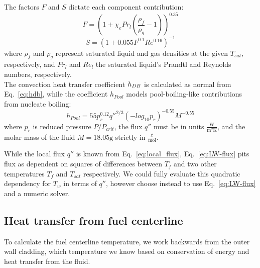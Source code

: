 \documentclass[12pt]{article}
\begin{document}
The factors $F$ and $S$ dictate each component contribution:
\begin{equation}
    \label{eq:LW-F}
    F = \left(1+\chi_ePr_l\left(\frac{\rho_f}{\rho_g}-1\right)\right)^{0.35}
\end{equation}
\begin{equation}
    \label{eq:LW-S}
    S = \left(1 + 0.055F^{0.1}Re^{0.16}\right)^{-1}
\end{equation}
where $\rho_f$ and $\rho_g$ represent saturated liquid and gas densities at the given $T_{sat}$, respectively, and $Pr_l$ and $Re_l$ the saturated liquid's Prandtl and Reynolds numbers, respectively.\\

The convection heat transfer coefficient $h_{DB}$ is calculated as normal from Eq.~\ref{eq:hdb}, while the coefficient $h_{Pool}$ models pool-boiling-like contributions from nucleate boiling\cite{liu_general_1991}:
\begin{equation}
    \label{eq:hpool}
    h_{Pool} = 55p_r^{0.12}q''^{2/3}(-log_{10}p_r)^{-0.55}M^{-0.55}
\end{equation}
where $p_r$ is reduced pressure $P/P_{crit}$, the flux $q''$ must be in units $\mathrm{\frac{W}{m^2K}}$, and the molar mass of the fluid $M=18.05\mathrm{g}$ strictly in $\mathrm{\frac{g}{mol}}$.

While the local flux $q''$ is known from Eq.~\ref{eq:local_flux}, Eq.~\ref{eq:LW-flux} pits flux as dependent on squares of differences between $T_f$ and two other temperatures $T_f$ and $T_{sat}$ respectively.
We could fully evaluate this quadratic dependency for $T_w$ in terms of $q''$, however choose instead to use Eq.~\ref{eq:LW-flux} and a numeric solver.

\subsection{Heat transfer from fuel centerline}
To calculate the fuel centerline temperature, we work backwards from the outer wall cladding, which temperature we know based on conservation of energy and heat transfer from the fluid.\\
\end{document}
